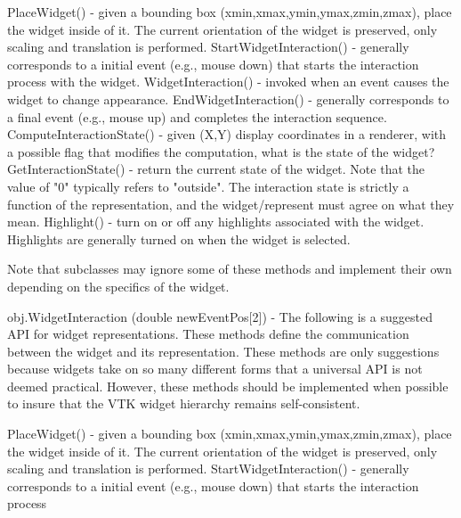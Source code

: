\begin{DoxyItemize}
\begin{DoxyPre}
 PlaceWidget() - given a bounding box (xmin,xmax,ymin,ymax,zmin,zmax), place 
                 the widget inside of it. The current orientation of the widget 
                 is preserved, only scaling and translation is performed.
 StartWidgetInteraction() - generally corresponds to a initial event (e.g.,
                            mouse down) that starts the interaction process
                            with the widget.
 WidgetInteraction() - invoked when an event causes the widget to change 
                       appearance.
 EndWidgetInteraction() - generally corresponds to a final event (e.g., mouse up)
                          and completes the interaction sequence.
 ComputeInteractionState() - given (X,Y) display coordinates in a renderer, with a
                             possible flag that modifies the computation,
                             what is the state of the widget?
 GetInteractionState() - return the current state of the widget. Note that the
                         value of "0" typically refers to "outside". The 
                         interaction state is strictly a function of the
                         representation, and the widget/represent must agree
                         on what they mean.
 Highlight() - turn on or off any highlights associated with the widget.
               Highlights are generally turned on when the widget is selected.
 \end{DoxyPre}
 Note that subclasses may ignore some of these methods and implement their own depending on the specifics of the widget.  
\item {\ttfamily obj.\-Widget\-Interaction (double new\-Event\-Pos\mbox{[}2\mbox{]})} -\/ The following is a suggested A\-P\-I for widget representations. These methods define the communication between the widget and its representation. These methods are only suggestions because widgets take on so many different forms that a universal A\-P\-I is not deemed practical. However, these methods should be implemented when possible to insure that the V\-T\-K widget hierarchy remains self-\/consistent. 
\begin{DoxyPre}
 PlaceWidget() - given a bounding box (xmin,xmax,ymin,ymax,zmin,zmax), place 
                 the widget inside of it. The current orientation of the widget 
                 is preserved, only scaling and translation is performed.
 StartWidgetInteraction() - generally corresponds to a initial event (e.g.,
                            mouse down) that starts the interaction process

\end{DoxyPre}
\end{DoxyItemize}
